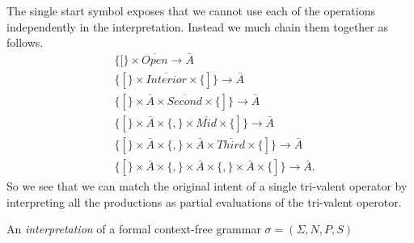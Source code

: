 The single start symbol exposes that we cannot use each of the operations 
independently in the interpretation.  Instead we much chain them together as follows.
\begin{align*}
    & \{[\}\times 
        \overline{Open}
    \to \bar{A}\\
    & \{[\}\times 
        \overline{Interior}
    \times \{]\}\to \bar{A}\\
    & \{[\}\times \bar{A}\times 
        \overline{Second}
    \times \{]\}\to \bar{A}\\
    & \{[\}\times \bar{A}\times  \{,\}
        \times \overline{Mid}
    \times \{]\}\to \bar{A}\\
    & \{[\}\times \bar{A}\times  \{,\}\times \bar{A}\times 
        \overline{Third}
    \times \{]\}\to \bar{A}\\
    & \{[\}\times \bar{A}\times  \{,\}\times \bar{A}\times \{,\}\times \bar{A}
    \times \{]\}\to \bar{A}.
\end{align*}
So we see that we can match the original intent of a single tri-valent operator 
by interpreting all the productions as partial evaluations of the 
tri-valent operotor.

\begin{definition}
    An \emph{interpretation} of a formal context-free grammar $\sigma=(\Sigma,N,P,S)$ 
\end{definition}
